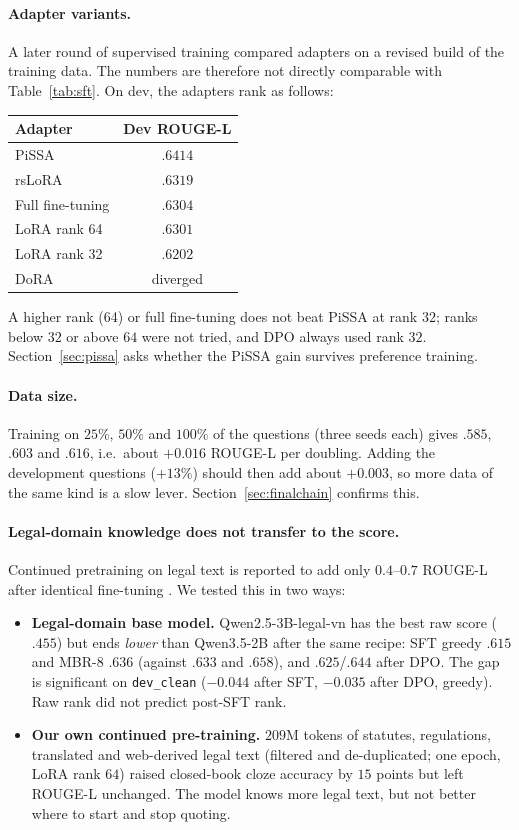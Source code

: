 \documentclass[11pt,a4paper]{article}
\newcommand{\rl}{ROUGE-L}
\begin{document}
\paragraph{Adapter variants.}
A later round of supervised training compared adapters on a revised build of the training data. The numbers are therefore not directly comparable with Table~\ref{tab:sft}. On dev, the adapters rank as follows:

\begin{center}
\small
\begin{tabular}{@{}lc@{}}
\toprule
Adapter & Dev \rl{}\\
\midrule
PiSSA \cite{pissa} & $.6414$\\
rsLoRA & $.6319$\\
Full fine-tuning & $.6304$\\
LoRA rank 64 & $.6301$\\
LoRA rank 32 & $.6202$\\
DoRA & diverged\\
\bottomrule
\end{tabular}
\end{center}

\noindent A higher rank (64) or full fine-tuning does not beat PiSSA at rank $32$; ranks below $32$ or above $64$ were not tried, and DPO always used rank $32$. Section~\ref{sec:pissa} asks whether the PiSSA gain survives preference training.

\paragraph{Data size.}
Training on $25\%$, $50\%$ and $100\%$ of the questions (three seeds each) gives $.585$, $.603$ and $.616$, i.e.\ about $+0.016$ \rl{} per doubling. Adding the development questions ($+13\%$) should then add about $+0.003$, so more data of the same kind is a slow lever. Section~\ref{sec:finalchain} confirms this.

\paragraph{Legal-domain knowledge does not transfer to the score.}
Continued pretraining on legal text is reported to add only $0.4$--$0.7$ \rl{} after identical fine-tuning \cite{vilegallm}. We tested this in two ways:
\begin{itemize}[leftmargin=*]
\item \textbf{Legal-domain base model.} Qwen2.5-3B-legal-vn has the best raw score ($.455$) but ends \emph{lower} than Qwen3.5-2B after the same recipe: SFT greedy $.615$ and MBR-8 $.636$ (against $.633$ and $.658$), and $.625$/$.644$ after DPO. The gap is significant on \texttt{dev\_clean} ($-0.044$ after SFT, $-0.035$ after DPO, greedy). Raw rank did not predict post-SFT rank.
\item \textbf{Our own continued pre-training.} $209$M tokens of statutes, regulations, translated and web-derived legal text (filtered and de-duplicated; one epoch, LoRA rank $64$) raised closed-book cloze accuracy by $15$ points but left \rl{} unchanged. The model knows more legal text, but not better where to start and stop quoting.
\end{itemize}
\end{document}
